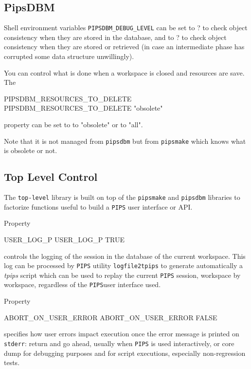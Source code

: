 \documentclass[a4paper]{report}
\newcommand{\Pips}{\texttt{PIPS}}
\newcommand{\Tpips}{{\em tpips}}
\begin{document}
\subsection{PipsDBM}

Shell environment variables \verb+PIPSDBM_DEBUG_LEVEL+ can be set to ?
to check object consistency when they are stored in the database, and to
? to check object consistency when they are stored or retrieved (in case
an intermediate phase has corrupted some data structure unwillingly).

You can control what is done when a workspace is closed and resources are
save. The
\begin{PipsProp}{PIPSDBM_RESOURCES_TO_DELETE}
PIPSDBM_RESOURCES_TO_DELETE "obsolete"
\end{PipsProp}
property can be set to to "obsolete" or to "all".

Note that it is not managed from {\tt pipsdbm} but from {\tt pipsmake}
which knows what is obsolete or not.



\subsection{Top Level Control}

The \verb/top-level/ library is built on top of the \verb/pipsmake/
and \verb/pipsdbm/ libraries to factorize functions useful to build a
\Pips{} user interface or API.

Property
\begin{PipsProp}{USER_LOG_P}
USER_LOG_P TRUE
\end{PipsProp}
controls the logging of the session in the database of the current
workspace. This log can be processed by \Pips{} utility \verb/logfile2tpips/
to generate automatically a \Tpips{} script which can be used to
replay the current \Pips{} session, workspace by workspace, regardless
of the \Pips user interface used.

Property
\begin{PipsProp}{ABORT_ON_USER_ERROR}
ABORT_ON_USER_ERROR FALSE
\end{PipsProp}
specifies how user errors impact execution once the error message is
printed on \verb/stderr/: return and go ahead, usually when \Pips{} is
used interactively, or core dump for debugging purposes and for script
executions, especially non-regression tests.
\end{document}
